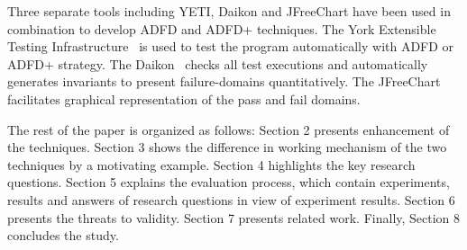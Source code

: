 \documentclass[runningheads,a4paper]{llncs}
\begin{document}
Three separate tools including YETI, Daikon and JFreeChart have been used in combination to develop ADFD and ADFD+ techniques. The York Extensible Testing Infrastructure~\cite{Oriol2011yeti} is used to test the program automatically with ADFD or ADFD+ strategy. The Daikon~\cite{ernst2007daikon} checks all test executions and automatically generates invariants to present failure-domains quantitatively. The JFreeChart~\cite{gilbert2008jfreechart} facilitates graphical representation of the pass and fail domains.




The rest of the paper is organized as follows: Section 2 presents enhancement of the techniques. Section 3 shows the difference in working mechanism of the two techniques by a motivating example. Section 4 highlights the key research questions. Section 5 explains the evaluation process, which contain experiments, results and answers of research questions in view of experiment results. Section 6 presents the threats to validity. Section 7 presents related work. Finally, Section 8 concludes the study.


 



\end{document}
